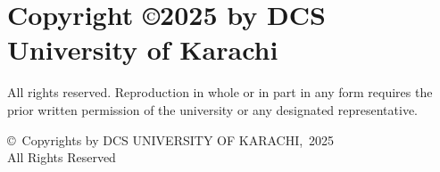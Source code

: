 
\thispagestyle{empty}
\addtocounter{page}{-1}
\section*{Copyright \copyright 2025 by DCS University of Karachi}
\large{All rights reserved.  Reproduction in whole or in part in any form requires the prior written permission of the university or any designated representative. }
\vspace*{\fill}
\vfill
\begin{center}
\small{\copyright\ Copyrights by \MakeUppercase{DCS University of Karachi},~2025\\
All Rights Reserved}
\end{center}
\clearpage
